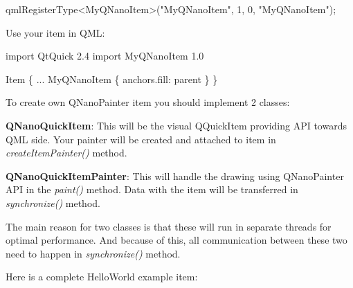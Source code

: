\begin{DoxyCode}
qmlRegisterType<MyQNanoItem>("MyQNanoItem", 1, 0, "MyQNanoItem");
\end{DoxyCode}



\begin{DoxyItemize}
\item Use your item in Q\+ML\+:
\end{DoxyItemize}


\begin{DoxyCode}
import QtQuick 2.4
import MyQNanoItem 1.0

Item \{
    ...
    MyQNanoItem \{
        anchors.fill: parent
    \}
\}
\end{DoxyCode}


To create own Q\+Nano\+Painter item you should implement 2 classes\+:


\begin{DoxyItemize}
\item {\bfseries Q\+Nano\+Quick\+Item}\+: This will be the visual Q\+Quick\+Item providing A\+PI towards Q\+ML side. Your painter will be created and attached to item in {\itshape create\+Item\+Painter()} method.
\item {\bfseries Q\+Nano\+Quick\+Item\+Painter}\+: This will handle the drawing using Q\+Nano\+Painter A\+PI in the {\itshape paint()} method. Data with the item will be transferred in {\itshape synchronize()} method.
\end{DoxyItemize}

The main reason for two classes is that these will run in separate threads for optimal performance. And because of this, all communication between these two need to happen in {\itshape synchronize()} method.

Here is a complete Hello\+World example item\+:


